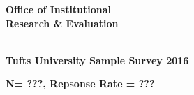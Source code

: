 \documentclass{article}
\begin{document}
\immediate{}
\pagestyle{fancy}
\fancyhf{}
\renewcommand{\headrulewidth}{0pt}
\renewcommand{\footrulewidth}{0pt}
\noindent\begin{minipage}{0.5\textwidth}
\begin{flushleft}
  \texttt{[image: \\logotemp.pdf]}}
\end{flushleft}
\end{minipage}
\hfill
\noindent\begin{minipage}{0.5\textwidth}
\begin{flushright}
  \textbf{\Large Office of Institutional\\ Research \& Evaluation} 
\end{flushright}
\end{minipage}
\hfill
\begin{center}
  \textbf{\Large \\Tufts University Sample Survey 2016 }
\end{center}
\begin{center}
  \textbf{\normalsize N= ???, Repsonse Rate = ??? }
\end{center}
\hline
\hline
\noindent\makebox[\linewidth]{\rule{\textwidth}{1pt}} 
\nopagebreak

\end{document}
